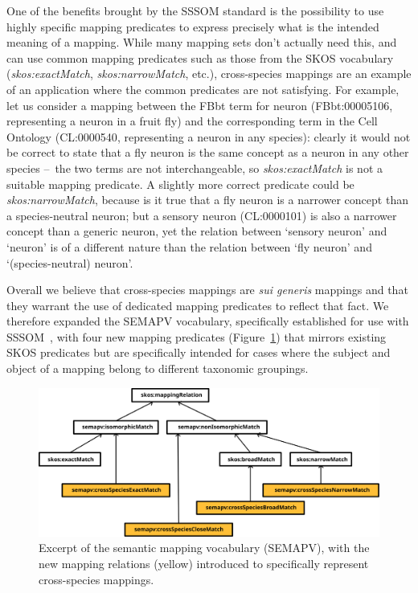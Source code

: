 \documentclass{ceurart}
\def\term#1{`#1'}
\def\property#1{\textit{#1}}
\def\curie#1{\textsf{#1}}
\begin{document}
One of the benefits brought by the SSSOM standard is the possibility to use
highly specific mapping predicates to express precisely what is the intended
meaning of a mapping. While many mapping sets don’t actually need this, and can
use common mapping predicates such as those from the SKOS
vocabulary~\cite{bechhofer2009} (\property{skos:exactMatch},
\property{skos:narrowMatch}, etc.), cross-species mappings are an example of an
application where the common predicates are not satisfying. For example, let us
consider a mapping between the FBbt term for neuron (\curie{FBbt:00005106},
representing a neuron in a fruit fly) and the corresponding term in the Cell
Ontology (\curie{CL:0000540}, representing a neuron in any species): clearly it
would not be correct to state that a fly neuron is the same concept as a neuron
in any other species --~the two terms are not interchangeable, so
\property{skos:exactMatch} is not a suitable mapping predicate.  A slightly
more correct predicate could be \property{skos:narrowMatch}, because is it true
that a fly neuron is a narrower concept than a species-neutral neuron; but a
sensory neuron (\curie{CL:0000101}) is also a narrower concept than a generic
neuron, yet the relation between \term{sensory neuron} and \term{neuron} is of
a different nature than the relation between \term{fly neuron} and
\term{(species-neutral) neuron}.

Overall we believe that cross-species mappings are \emph{sui generis}
mappings and that they warrant the use of dedicated mapping predicates
to reflect that fact. We therefore expanded the SEMAPV vocabulary,
specifically established for use with SSSOM~\cite{matentzoglu2022}, with
four new mapping predicates (Figure~\ref{fig:relations}) that mirrors
existing SKOS predicates but are specifically intended for cases where
the subject and object of a mapping belong to different taxonomic
groupings.

\begin{figure}
  \centering
  \includegraphics[width=.8\linewidth]{figs/relations}
  \caption{Excerpt of the semantic mapping vocabulary (SEMAPV), with the
  new mapping relations (yellow) introduced to specifically represent
  cross-species mappings.}
  \label{fig:relations}
\end{figure}
\end{document}
